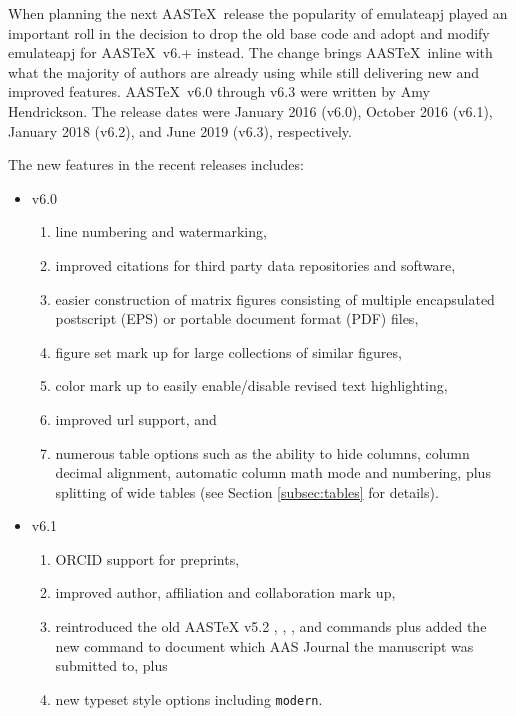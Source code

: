 \documentclass{aastex63}
\newcommand\aastex{AAS\TeX}
\begin{document}
When planning the next \aastex\ release the popularity of emulateapj played
an important roll in the decision to drop the old base code and adopt and
modify emulateapj for \aastex\ v6.+ instead.  The change brings \aastex\
inline with what the majority of authors are already using while still
delivering new and improved features.  \aastex\ v6.0 through v6.3 were
written by Amy Hendrickson. The release dates were January 2016 (v6.0),
October 2016 (v6.1), January 2018 (v6.2), and June 2019 (v6.3),
respectively.

The new features in the recent releases includes:

\begin{itemize}
 \item{v6.0}
   \begin{enumerate}
      \item line numbering and watermarking,
      \item improved citations for third party data repositories and software,
      \item easier construction of matrix figures consisting of multiple 
encapsulated postscript (EPS) or portable document format (PDF) files,
      \item figure set mark up for large collections of similar figures,
      \item color mark up to easily enable/disable revised text highlighting,
      \item improved url support, and
      \item numerous table options such as the ability to hide columns, column decimal alignment, automatic column math mode and numbering, plus splitting of wide tables (see Section \ref{subsec:tables} for details).
    \end{enumerate}
  \item{v6.1}
    \begin{enumerate}
      \item ORCID support for preprints,
      \item improved author, affiliation and collaboration mark up,
      \item reintroduced the old AASTeX v5.2 {\tt\string\received}, {\tt\string\revised}, {\tt\string\accepted}, and {\tt\string\published} commands plus added the new {\tt\string\submitjournal} command to document which AAS Journal the manuscript was submitted to, plus
      \item new typeset style options including {\tt\string modern}.
    \end{enumerate}

\end{itemize}
\end{document}
